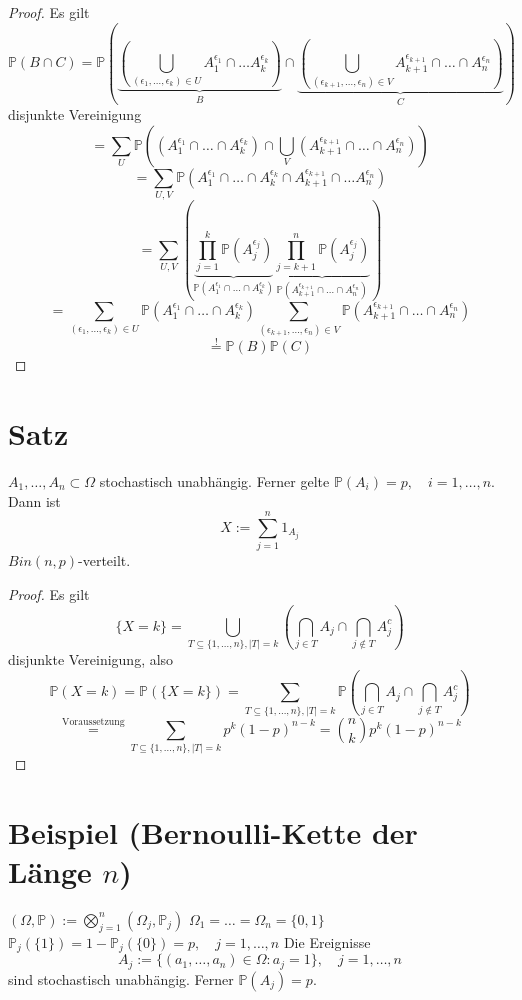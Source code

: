 \documentclass[a4paper,11pt,notitlepage]{report}
\newcommand{\Prim}{{\ensuremath{\mathbb{P}}}}
\begin{document}
\begin{proof}
	Es gilt
	$$\Prim(B \cap C) = \Prim\left( \underbrace{(\bigcup\limits_{(\epsilon_1, \ldots, \epsilon_k) \in U}{A_1^{\epsilon_1} \cap \ldots A_k^{\epsilon_k}})}_{B} \cap \underbrace{(\bigcup\limits_{(\epsilon_{k+1}, \ldots, \epsilon_n) \in V}{A_{k+1}^{\epsilon_{k+1}} \cap \ldots \cap A_n^{\epsilon_n}})}_{C} \right)$$
	disjunkte Vereinigung
	$$= \sum\limits_{U}{\Prim\left((A_1^{\epsilon_1} \cap \ldots \cap A_k^{\epsilon_k}) \cap \bigcup\limits_{V}{(A_{k+1}^{\epsilon_{k+1}} \cap \ldots \cap A_n^{\epsilon_n})}\right)}$$
	$$= \sum\limits_{U,V}{\Prim(A_1^{\epsilon_1} \cap \ldots \cap A_k^{\epsilon_k} \cap A_{k+1}^{\epsilon_{k+1}} \cap \ldots A_n^{\epsilon_n})}$$
	$$=\sum\limits_{U,V}{\left(\underbrace{\prod\limits_{j=1}^k{\Prim(A_j^{\epsilon_j})}}_{\Prim(A_1^{\epsilon_1} \cap \ldots \cap A_k^{\epsilon_k})} \underbrace{\prod\limits_{j=k+1}^n{\Prim(A_j^{\epsilon_j})}}_{\Prim(A_{k+1}^{\epsilon_{k+1}} \cap \ldots \cap A_n^{\epsilon_n})}\right)}$$
	$$=\sum\limits_{(\epsilon_1, \ldots, \epsilon_k) \in U}{\Prim(A_1^{\epsilon_1} \cap \ldots \cap A_k^{\epsilon_k})} \sum\limits_{(\epsilon_{k+1}, \ldots, \epsilon_n) \in V}{\Prim(A_{k+1}^{\epsilon_{k+1}} \cap \ldots \cap A_n^{\epsilon_n})}$$
	$$\overset{!}{=} \Prim(B) \Prim(C)$$
\end{proof}

\section{Satz}
$A_1, \ldots, A_n \subset \Omega$ stochastisch unabhängig. Ferner gelte $\Prim(A_i)=p, \quad i = 1, \ldots, n$. Dann ist
$$X := \sum\limits_{j=1}^n{1_{A_j}}$$
$Bin(n,p)$-verteilt.

\begin{proof}
	Es gilt
	$$\{X=k\} = \bigcup\limits_{T \subseteq \{1, \ldots,n\}, |T|=k}{\left( \bigcap\limits_{j \in T}{A_j} \cap \bigcap\limits_{j \notin T}{A_j^c}\right )}$$
	disjunkte Vereinigung, also
	$$\Prim(X=k)=\Prim(\{X=k\}) = \sum\limits_{T \subseteq \{1, \ldots, n\}, |T| = k}{\Prim(\bigcap\limits_{j \in T}{A_j} \cap \bigcap\limits_{j \notin T}{A_j^c})}$$
	$$\overset{\text{Voraussetzung}}{=}\sum\limits_{T \subseteq \{1, \ldots, n\}, |T| = k}{p^k (1-p)^{n-k}} = {n \choose k} p^k (1-p)^{n-k}$$
\end{proof}

\section{Beispiel (Bernoulli-Kette der Länge $n$)}
$(\Omega, \Prim):= \bigotimes\limits_{j=1}^n{(\Omega_j, \Prim_j)}$
\newline
$\Omega_1=\ldots=\Omega_n = \{0,1\}$
\newline
$\Prim_j(\{1\}) = 1 - \Prim_j(\{0\}) = p, \quad j = 1, \ldots, n$
\newline
Die Ereignisse 
	$$A_j := \{(a_1, \ldots, a_n)\in \Omega \colon a_j = 1\}, \quad j=1, \ldots, n$$
	sind stochastisch unabhängig.
\newline
Ferner $\Prim(A_j)=p$.
\end{document}
